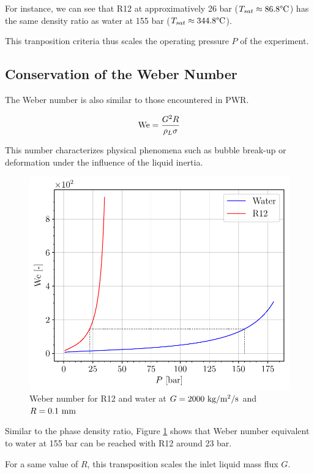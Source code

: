 For instance, we can see that R12 at approximatively 26 bar ($T_{sat} \approx 86.8 \degree\mathrm{C}$) has the same density ratio as water at 155 bar ($T_{sat} \approx 344.8 \degree\mathrm{C}$).

\npar

\begin{note*}{}
This tranposition criteria thus scales the operating pressure $P$ of the experiment.
\end{note*}

\subsection{Conservation of the Weber Number}

The Weber number is also similar to those encountered in PWR.

\begin{equation}
\mathrm{We} = \dfrac{G^{2}R}{\rho_{L} \sigma}
\end{equation}

This number characterizes physical phenomena such as bubble break-up or deformation under the influence of the liquid inertia.

\begin{figure}[!h]
\centering
\includegraphics[width=0.6\linewidth]{img/DEBORA/We_R12_PWR.pdf}
\caption{Weber number for R12 and water at $G=2000~\text{kg/m$^{2}$/s}$ and $R=0.1~\mathrm{mm}$}
\label{fig:We_R12_PWR}
\end{figure}

Similar to the phase density ratio, Figure \ref{fig:We_R12_PWR} shows that Weber number equivalent to water at 155 bar can be reached with  R12 around 23 bar.

\npar

\begin{note*}{}
For a same value of $R$, this transposition scales the inlet liquid mass flux $G$.
\end{note*}

